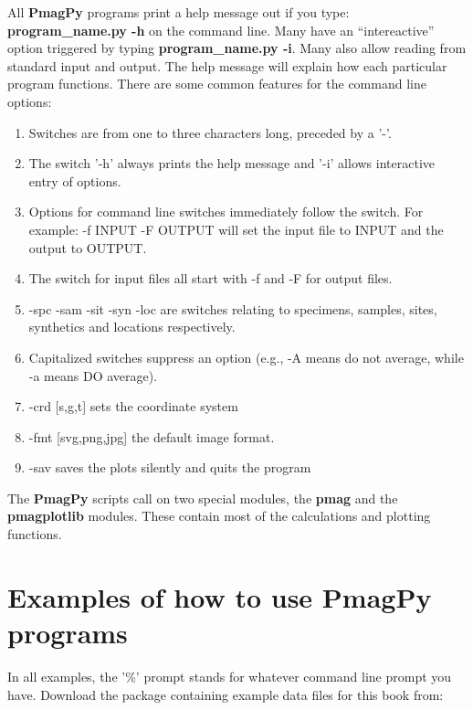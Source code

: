 \documentclass[11pt]{book}
\begin{document}
{{{  All  {\bf PmagPy} programs print a help message out if you type: {\bf program\_name.py -h} on the command line.  Many have an ``intereactive'' option triggered by typing {\bf program\_name.py -i}.  Many also allow reading from standard input and output.   The help message will explain how each particular program functions.  There are some common features for the command line options: 
  

\begin{enumerate}
\item Switches are from one to three characters long, preceded by a '-'.  
\item The switch '-h' always prints the help message and '-i' allows interactive entry of options. 
\item  Options for command line switches immediately follow the switch.  For example:  -f INPUT -F OUTPUT will set the input file to INPUT and the output to OUTPUT.
\item  The switch for input  files all start with -f and -F for output files.
\item -spc -sam -sit -syn  -loc are switches relating to specimens, samples, sites, synthetics and locations respectively.  
\item Capitalized switches suppress an option (e.g., -A means do not average, while -a means DO average).  
\item -crd [s,g,t] sets the coordinate system 
\item -fmt [svg,png,jpg] the default image format.  
\item -sav  saves the plots silently and quits the program
\end{enumerate}
\newcommand{\stt}{\small\tt}
\newcount\exnum
\outer{}
  
 The {\bf PmagPy} scripts call on two special modules, the {\bf pmag} and the {\bf pmagplotlib} modules.  These contain most of the calculations and plotting functions.  


\chapter{Examples of how to use {\bf PmagPy} programs}
\label{ex:PmagPyEx}

In all examples, the '\%' prompt stands for whatever command line prompt you have. 
Download the package containing example data files for this book from: 

}}}
\end{document}
